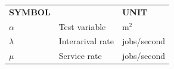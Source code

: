 \listofsymbols
\begin{flushleft}
\begin{tabular}{@{}p{}p{}p{}}
\textbf{SYMBOL}  & & \textbf{UNIT} \\[0.2cm]
$\alpha$ & Test variable\hfill & m$^2$ \\
$\lambda$ & Interarival rate\hfill &  jobs/second\\
$\mu$ & Service rate\hfill & jobs/second\\
\end{tabular}
\end{flushleft}
